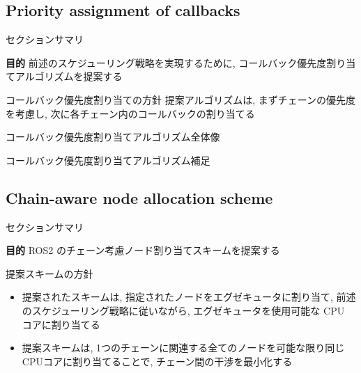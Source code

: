 \subsection{Priority assignment of callbacks}
\label{ssec: priority assignment of callbacks}

\begin{frame}{セクションサマリ}
    \begin{itembox}[l]{\textbf{目的}}
        前述のスケジューリング戦略を実現するために, コールバック優先度割り当てアルゴリズムを提案する
    \end{itembox}
\end{frame}

\begin{frame}{コールバック優先度割り当ての方針}
    提案アルゴリズムは, まずチェーンの優先度を考慮し, 次に各チェーン内のコールバックの割り当てる
\end{frame}

\begin{frame}{コールバック優先度割り当てアルゴリズム全体像}
\end{frame}

\begin{frame}[label=alg1]{コールバック優先度割り当てアルゴリズム補足}
\end{frame}


\subsection{Chain-aware node allocation scheme}
\label{ssec: chain-aware node allocation scheme}

\begin{frame}{セクションサマリ}
    \begin{itembox}[l]{\textbf{目的}}
        ROS2 のチェーン考慮ノード割り当てスキームを提案する
    \end{itembox}
\end{frame}

\begin{frame}{提案スキームの方針}
    \begin{itemize}
        \item 提案されたスキームは, 指定されたノードをエグゼキュータに割り当て, 前述のスケジューリング戦略に従いながら, エグゼキュータを使用可能な CPU コアに割り当てる
        \item 提案スキームは, 1つのチェーンに関連する全てのノードを可能な限り同じCPUコアに割り当てることで, チェーン間の干渉を最小化する
    \end{itemize}
\end{frame}


